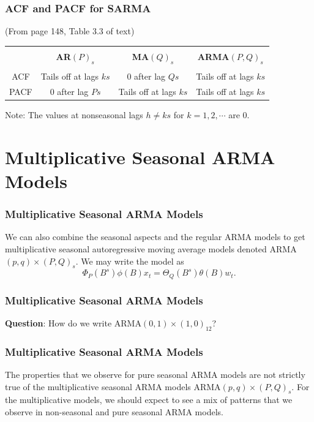 \documentclass[%
xcolor=pdftex]{beamer}
\begin{document}
\begin{frame}
\frametitle{ACF and PACF for SARMA}

(From page 148, Table 3.3 of text)

\begin{center}
\begin{tabular}{cccc}
\hline \\
 & \textbf{AR$(P)_s$} & \textbf{MA$(Q)_s$} & \textbf{ARMA$(P,Q)_s$} \\
\hline \\
ACF & Tails off at lags $ks$ & 0 after lag $Qs$ & Tails off at lags $ks$\\
PACF & 0 after lag $Ps$ & Tails off at lags $ks$ & Tails off at lags $ks$\\
\hline
\end{tabular}
\end{center}

Note: The values at nonseasonal lags $h \neq ks$ for $k=1,2,\cdots$ are 0.

\end{frame}

\section{Multiplicative Seasonal ARMA Models}
\frame{\tableofcontents[currentsection]}

\begin{frame}
\frametitle{Multiplicative Seasonal ARMA Models}

We can also combine the seasonal aspects and
 the regular ARMA models to get multiplicative seasonal
 autoregressive moving average models denoted ARMA$(p,q) \times (P,Q)_s$.  We may write the model as
\begin{equation}
\Phi_P(B^s) \phi(B) x_t=\Theta_Q(B^s) \theta(B) w_t.
\end{equation}

\end{frame}

\begin{frame}
\frametitle{Multiplicative Seasonal ARMA Models}

\textbf{Question}: How do we write ARMA$(0,1) \times (1,0)_{12}$?

\vspace{50mm}

\end{frame}

\begin{frame}
\frametitle{Multiplicative Seasonal ARMA Models}

The properties that we observe for pure seasonal ARMA models are not strictly true of the multiplicative seasonal ARMA models ARMA$(p,q) \times (P,Q)_s$. For the multiplicative models, we should expect to see a mix of patterns that we observe  in non-seasonal and pure seasonal ARMA models.


\end{frame}
\end{document}
